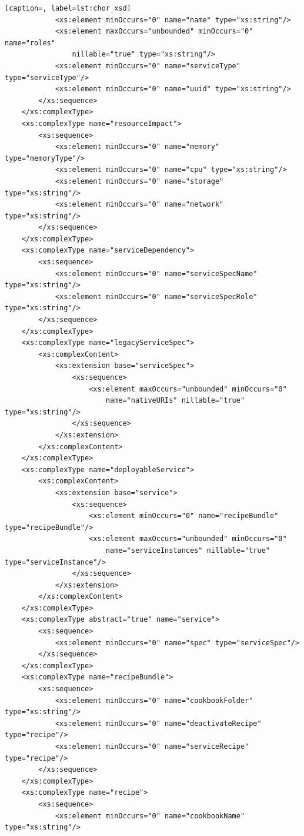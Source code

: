 \documentclass[a4paper, 10pt]{article}
\begin{document}
{\begin{lstlisting}[caption=, label=lst:chor_xsd]
            <xs:element minOccurs="0" name="name" type="xs:string"/>
            <xs:element maxOccurs="unbounded" minOccurs="0" name="roles"
                nillable="true" type="xs:string"/>
            <xs:element minOccurs="0" name="serviceType" type="serviceType"/>
            <xs:element minOccurs="0" name="uuid" type="xs:string"/>
        </xs:sequence>
    </xs:complexType>
    <xs:complexType name="resourceImpact">
        <xs:sequence>
            <xs:element minOccurs="0" name="memory" type="memoryType"/>
            <xs:element minOccurs="0" name="cpu" type="xs:string"/>
            <xs:element minOccurs="0" name="storage" type="xs:string"/>
            <xs:element minOccurs="0" name="network" type="xs:string"/>
        </xs:sequence>
    </xs:complexType>
    <xs:complexType name="serviceDependency">
        <xs:sequence>
            <xs:element minOccurs="0" name="serviceSpecName" type="xs:string"/>
            <xs:element minOccurs="0" name="serviceSpecRole" type="xs:string"/>
        </xs:sequence>
    </xs:complexType>
    <xs:complexType name="legacyServiceSpec">
        <xs:complexContent>
            <xs:extension base="serviceSpec">
                <xs:sequence>
                    <xs:element maxOccurs="unbounded" minOccurs="0"
                        name="nativeURIs" nillable="true" type="xs:string"/>
                </xs:sequence>
            </xs:extension>
        </xs:complexContent>
    </xs:complexType>
    <xs:complexType name="deployableService">
        <xs:complexContent>
            <xs:extension base="service">
                <xs:sequence>
                    <xs:element minOccurs="0" name="recipeBundle" type="recipeBundle"/>
                    <xs:element maxOccurs="unbounded" minOccurs="0"
                        name="serviceInstances" nillable="true" type="serviceInstance"/>
                </xs:sequence>
            </xs:extension>
        </xs:complexContent>
    </xs:complexType>
    <xs:complexType abstract="true" name="service">
        <xs:sequence>
            <xs:element minOccurs="0" name="spec" type="serviceSpec"/>
        </xs:sequence>
    </xs:complexType>
    <xs:complexType name="recipeBundle">
        <xs:sequence>
            <xs:element minOccurs="0" name="cookbookFolder" type="xs:string"/>
            <xs:element minOccurs="0" name="deactivateRecipe" type="recipe"/>
            <xs:element minOccurs="0" name="serviceRecipe" type="recipe"/>
        </xs:sequence>
    </xs:complexType>
    <xs:complexType name="recipe">
        <xs:sequence>
            <xs:element minOccurs="0" name="cookbookName" type="xs:string"/>

\end{lstlisting}}
\end{document}
